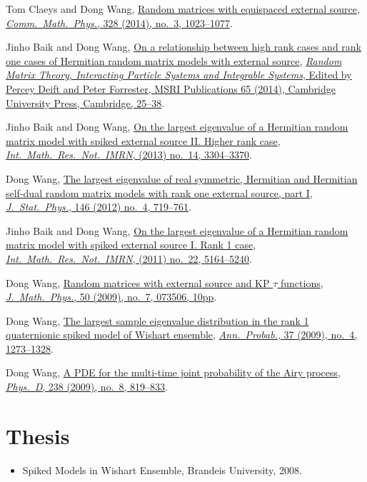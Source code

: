 \documentclass[12pt, a4paper]{article}
\begin{document}
\begin{etaremune}
\item 
  Tom Claeys and Dong Wang,
  \href{http://arxiv.org/abs/1212.3768}{Random matrices with equispaced external source}, \href{https://doi.org/10.1007/s00220-014-1988-y}{\textit{Comm.\ Math.\ Phys.}, 328 (2014), no.\ 3, 1023--1077}.
\item Jinho Baik and Dong Wang,
  \href{http://arxiv.org/abs/1207.0389}{On a relationship between high rank cases and rank one cases of Hermitian random matrix models with external source}, \href{http://www.cambridge.org/asia/catalogue/catalogue.asp?isbn=9781107079922}{\textit{Random Matrix Theory, Interacting Particle Systems and Integrable Systems}, Edited by Percey Deift and Peter Forrester, MSRI Publications 65 (2014), Cambridge University Press, Cambridge, 25--38}.
\item Jinho Baik and Dong Wang,
  \href{http://arxiv.org/abs/1104.2915}{On the largest eigenvalue of a Hermitian random matrix model with spiked external source II. Higher rank case}, \href{https://doi.org/10.1093/imrn/rns136}{\textit{Int.\ Math.\ Res.\ Not.\ IMRN}, (2013) no.\ 14, 3304--3370}.
\item Dong Wang,
  \href{http://arxiv.org/abs/1012.4144}{The largest eigenvalue of real symmetric, Hermitian and Hermitian self-dual random matrix models with rank one external source, part I}, \href{https://doi.org/10.1007/s10955-012-0417-x}{\textit{J.\ Stat.\ Phys.}, 146 (2012) no.\ 4, 719--761}.
\item Jinho Baik and  Dong Wang,
  \href{http://arxiv.org/abs/1010.4604}{On the largest eigenvalue of a Hermitian random matrix model with spiked external source I. Rank 1 case}, \href{https://doi.org/10.1093/imrn/rnq257}{\textit{Int.\ Math.\ Res.\ Not.\ IMRN}, (2011) no.\ 22, 5164--5240}.
\item Dong Wang,
  \href{http://arxiv.org/abs/0810.0280}{Random matrices with external source and KP $\tau$ functions}, \href{https://doi.org/10.1063/1.3167802}{\textit{J.\ Math.\ Phys.}, 50 (2009), no.\ 7, 073506, 10pp}.
\item Dong Wang,
 \href{http://arxiv.org/abs/0711.2722}{The largest sample eigenvalue distribution in the rank 1 quaternionic spiked model of Wishart ensemble}, \href{https://doi.org/10.1214/08-AOP432}{\textit{Ann.\ Probab.}, 37 (2009), no.\ 4, 1273--1328}.
\item Dong Wang,
  \href{http://arxiv.org/abs/0711.3797}{A PDE for the multi-time joint probability of the Airy process}, \href{https://doi.org/10.1016/j.physd.2009.02.007}{\textit{Phys.\ D}, 238 (2009), no.\ 8, 819--833}.
\end{etaremune}

\section*{Thesis}

\begin{itemize}
\item
  Spiked Models in Wishart Ensemble, Brandeis University, 2008.
\end{itemize}
\end{document}
